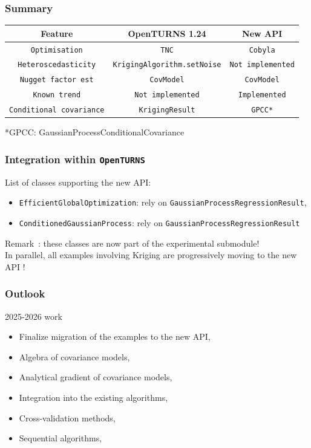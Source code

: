\documentclass[aspectratio=169]{beamer}
\begin{document}
\begin{frame}[containsverbatim]
\frametitle{Summary}

\begin{center}
\begin{tabular}{|c|c|c|}
  \hline
   \textbf{Feature} & \textbf{OpenTURNS 1.24} & \textbf{New API} \\ 
  \hline
   \texttt{Optimisation} & \texttt{TNC} & \texttt{Cobyla} \\
   \texttt{Heteroscedasticity} & \texttt{KrigingAlgorithm.setNoise} & \texttt{Not implemented}\\
   \texttt{Nugget factor est} & \texttt{CovModel} & \texttt{CovModel}\\
   \texttt{Known trend} & \texttt{Not implemented} & \texttt{Implemented}\\
   \texttt{Conditional covariance} & \texttt{KrigingResult} & \texttt{GPCC*}\\
  \hline
\end{tabular}
\end{center}
*GPCC: GaussianProcessConditionalCovariance
\end{frame}


\begin{frame}[containsverbatim]
\frametitle{Integration within \texttt{OpenTURNS}}

List of classes supporting the new API:
\begin{itemize}
\item \texttt{EfficientGlobalOptimization}: rely on \texttt{GaussianProcessRegressionResult},
\item \texttt{ConditionedGaussianProcess}: rely on \texttt{GaussianProcessRegressionResult}
\end{itemize}
Remark~: these classes are now part of the experimental submodule!\\

In parallel, all examples involving Kriging are progressively moving to the new API !

\end{frame}


\begin{frame}
\frametitle{Outlook}
\begin{block}{2025-2026 work}
\begin{itemize}
\item Finalize migration of the examples to the new API,
\item Algebra of covariance models,
\item Analytical gradient of covariance models,
\item Integration into the existing algorithms,
\item Cross-validation methods,
\item Sequential algorithms,
\end{itemize}
\end{block}
\end{frame}
\end{document}
